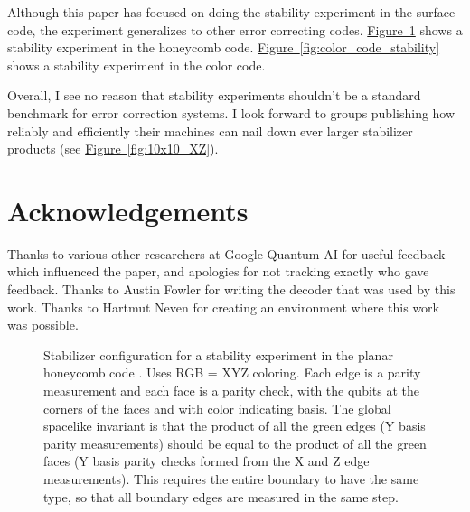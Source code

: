 \documentclass[onecolumn,unpublished,a4paper]{quantumarticle}
\theoremstyle{definition}
\theoremstyle{definition}
\theoremstyle{definition}
\newcommand{\fig}[1]{\hyperref[fig:#1]{Figure~\ref*{fig:#1}}}
\begin{document}
Although this paper has focused on doing the stability experiment in the surface code, the experiment generalizes to other error correcting codes.
\fig{honeycomb_stability} shows a stability experiment in the honeycomb code.
\fig{color_code_stability} shows a stability experiment in the color code.

Overall, I see no reason that stability experiments shouldn't be a standard benchmark for error correction systems.
I look forward to groups publishing how reliably and efficiently their machines can nail down ever larger stabilizer products (see \fig{10x10_XZ}).

\section{Acknowledgements}

Thanks to various other researchers at Google Quantum AI for useful feedback which influenced the paper, and apologies for not tracking exactly who gave feedback.
Thanks to Austin Fowler for writing the decoder that was used by this work.
Thanks to Hartmut Neven for creating an environment where this work was possible.


\printbibliography

\clearpage

\begin{figure}
    \centering
    \caption{
        Stabilizer configuration for a stability experiment in the planar honeycomb code \cite{hastings2021dynamically,gidney2021honeycombmemory,haah2021boundaries,gidney2022benchmarking,paetznick2022performance}.
        Uses RGB = XYZ coloring.
        Each edge is a parity measurement and each face is a parity check, with the qubits at the corners of the faces and with color indicating basis.
        The global spacelike invariant is that the product of all the green edges (Y basis parity measurements) should be equal to the product of all the green faces (Y basis parity checks formed from the X and Z edge measurements).
        This requires the entire boundary to have the same type, so that all boundary edges are measured in the same step.
    }
    \label{fig:honeycomb_stability}
\end{figure}
\end{document}
